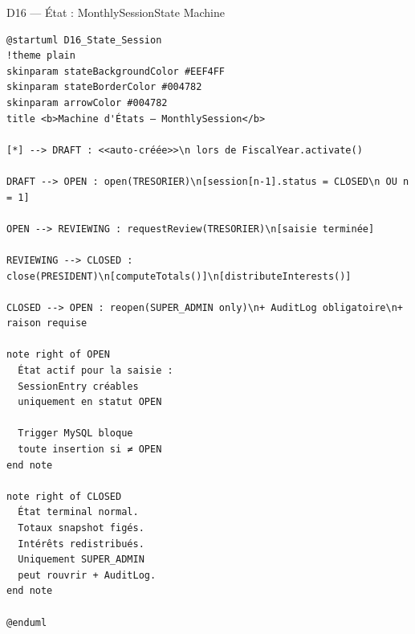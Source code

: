 \documentclass[12pt, a4paper]{report}
\begin{document}
\begin{diagramBox}{D16 — État : MonthlySession}{State Machine}
\begin{lstlisting}
@startuml D16_State_Session
!theme plain
skinparam stateBackgroundColor #EEF4FF
skinparam stateBorderColor #004782
skinparam arrowColor #004782
title <b>Machine d'États — MonthlySession</b>

[*] --> DRAFT : <<auto-créée>>\n lors de FiscalYear.activate()

DRAFT --> OPEN : open(TRESORIER)\n[session[n-1].status = CLOSED\n OU n = 1]

OPEN --> REVIEWING : requestReview(TRESORIER)\n[saisie terminée]

REVIEWING --> CLOSED : close(PRESIDENT)\n[computeTotals()]\n[distributeInterests()]

CLOSED --> OPEN : reopen(SUPER_ADMIN only)\n+ AuditLog obligatoire\n+ raison requise

note right of OPEN
  État actif pour la saisie :
  SessionEntry créables
  uniquement en statut OPEN

  Trigger MySQL bloque
  toute insertion si ≠ OPEN
end note

note right of CLOSED
  État terminal normal.
  Totaux snapshot figés.
  Intérêts redistribués.
  Uniquement SUPER_ADMIN
  peut rouvrir + AuditLog.
end note

@enduml
\end{lstlisting}
\end{diagramBox}
\end{document}
